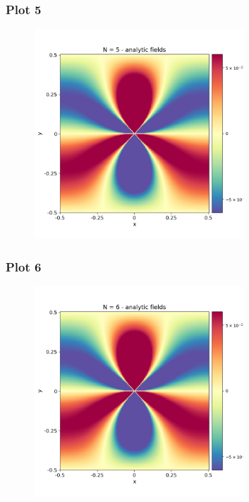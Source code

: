 \documentclass{beamer}
\begin{document}
\begin{frame}
    \frametitle{Plot 5}
    \begin{figure}[H]
        \centering
        \includegraphics[width=0.7\textwidth]{../stress_field_05.png}
    \end{figure}
\end{frame}

\begin{frame}
    \frametitle{Plot 6}
    \begin{figure}[H]
        \centering
        \includegraphics[width=0.7\textwidth]{../stress_field_06.png}
    \end{figure}
\end{frame}
\end{document}
